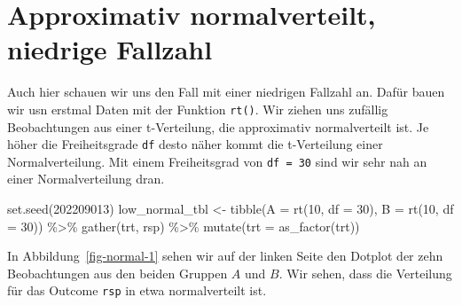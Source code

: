 \documentclass[
  letterpaper,
]{scrbook}
\newenvironment{Shaded}{\begin{snugshade}}{\end{snugshade}}
\newcommand{\AttributeTok}[1]{\textcolor[rgb]{0.40,0.45,0.13}{#1}}
\newcommand{\DecValTok}[1]{\textcolor[rgb]{0.68,0.00,0.00}{#1}}
\newcommand{\FunctionTok}[1]{\textcolor[rgb]{0.28,0.35,0.67}{#1}}
\newcommand{\NormalTok}[1]{\textcolor[rgb]{0.00,0.23,0.31}{#1}}
\newcommand{\OtherTok}[1]{\textcolor[rgb]{0.00,0.23,0.31}{#1}}
\newcommand{\SpecialCharTok}[1]{\textcolor[rgb]{0.37,0.37,0.37}{#1}}
\begin{document}
\hypertarget{approximativ-normalverteilt-niedrige-fallzahl}{%
\section{Approximativ normalverteilt, niedrige
Fallzahl}\label{approximativ-normalverteilt-niedrige-fallzahl}}

Auch hier schauen wir uns den Fall mit einer niedrigen Fallzahl an.
Dafür bauen wir usn erstmal Daten mit der Funktion \texttt{rt()}. Wir
ziehen uns zufällig Beobachtungen aus einer t-Verteilung, die
approximativ normalverteilt ist. Je höher die Freiheitsgrade \texttt{df}
desto näher kommt die t-Verteilung einer Normalverteilung. Mit einem
Freiheitsgrad von \texttt{df\ =\ 30} sind wir sehr nah an einer
Normalverteilung dran.

\begin{Shaded}
\begin{Highlighting}[]
\FunctionTok{set.seed}\NormalTok{(}\DecValTok{202209013}\NormalTok{)}
\NormalTok{low\_normal\_tbl }\OtherTok{\textless{}{-}} \FunctionTok{tibble}\NormalTok{(}\AttributeTok{A =} \FunctionTok{rt}\NormalTok{(}\DecValTok{10}\NormalTok{, }\AttributeTok{df =} \DecValTok{30}\NormalTok{),}
                         \AttributeTok{B =} \FunctionTok{rt}\NormalTok{(}\DecValTok{10}\NormalTok{, }\AttributeTok{df =} \DecValTok{30}\NormalTok{)) }\SpecialCharTok{\%\textgreater{}\%} 
  \FunctionTok{gather}\NormalTok{(trt, rsp) }\SpecialCharTok{\%\textgreater{}\%} 
  \FunctionTok{mutate}\NormalTok{(}\AttributeTok{trt =} \FunctionTok{as\_factor}\NormalTok{(trt))}
\end{Highlighting}
\end{Shaded}

In Abbildung~\ref{fig-normal-1} sehen wir auf der linken Seite den
Dotplot der zehn Beobachtungen aus den beiden Gruppen \(A\) und \(B\).
Wir sehen, dass die Verteilung für das Outcome \texttt{rsp} in etwa
normalverteilt ist.
\end{document}
